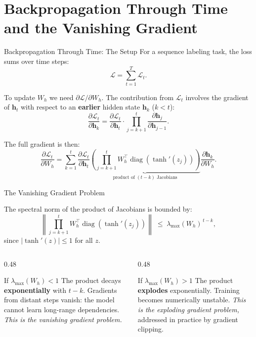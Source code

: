 \documentclass[aspectratio=169]{beamer}
\begin{document}
\section{Backpropagation Through Time and the Vanishing Gradient}
%
\begin{frame}{Backpropagation Through Time: The Setup}
\small
For a sequence labeling task, the loss sums over time steps:
\[
\mathcal{L} = \sum_{t=1}^{T} \mathcal{L}_t.
\]

To update $W_h$ we need $\partial \mathcal{L} / \partial W_h$.
The contribution from $\mathcal{L}_t$ involves the gradient of $\bm{h}_t$
with respect to an \textbf{earlier} hidden state $\bm{h}_k$ ($k < t$):
\[
\frac{\partial \mathcal{L}_t}{\partial \bm{h}_k}
= \frac{\partial \mathcal{L}_t}{\partial \bm{h}_t}
  \cdot \prod_{j=k+1}^{t} \frac{\partial \bm{h}_j}{\partial \bm{h}_{j-1}}.
\]

The full gradient is then:
\[
\frac{\partial \mathcal{L}_t}{\partial W_h}
= \sum_{k=1}^{t}
  \frac{\partial \mathcal{L}_t}{\partial \bm{h}_t}
  \underbrace{\left(\prod_{j=k+1}^{t}
    W_h^{\!\top}\operatorname{diag}(\tanh'(z_j))
  \right)}_{\text{product of }(t-k)\text{ Jacobians}}
  \frac{\partial \bm{h}_k}{\partial W_h}.
\]
\end{frame}
%
%
\begin{frame}{The Vanishing Gradient Problem}

The spectral norm of the product of Jacobians is bounded by:
\[
\left\|\prod_{j=k+1}^{t} W_h^{\!\top}\operatorname{diag}(\tanh'(z_j))\right\|
\;\leq\;
\lambda_{\max}(W_h)^{\,t-k},
\]
since $|\tanh'(z)| \leq 1$ for all $z$.

\vspace{0.15cm}
\begin{columns}[T]
\begin{column}{0.48\textwidth}
\begin{alertblock}{If $\lambda_{\max}(W_h) < 1$}
The product decays \textbf{exponentially} with $t - k$.
Gradients from distant steps vanish: the model cannot learn
long-range dependencies.
\emph{This is the vanishing gradient problem.}
\end{alertblock}
\end{column}
\begin{column}{0.48\textwidth}
\begin{alertblock}{If $\lambda_{\max}(W_h) > 1$}
The product \textbf{explodes} exponentially.
Training becomes numerically unstable.
\emph{This is the exploding gradient problem,}
addressed in practice by gradient clipping.
\end{alertblock}
\end{column}
\end{columns}
\end{frame}
\end{document}
